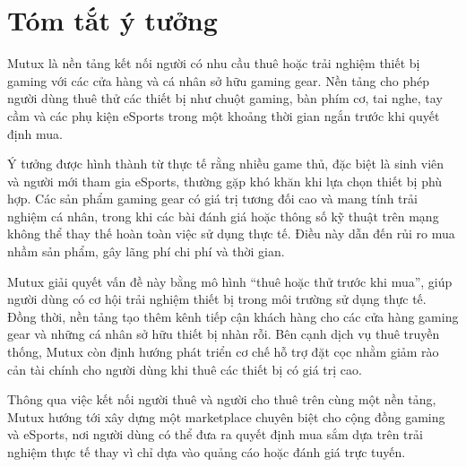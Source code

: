 \section{Tóm tắt ý tưởng}

Mutux là nền tảng kết nối người có nhu cầu thuê hoặc trải nghiệm thiết bị gaming với các cửa hàng và cá nhân sở hữu gaming gear. Nền tảng cho phép người dùng thuê thử các thiết bị như chuột gaming, bàn phím cơ, tai nghe, tay cầm và các phụ kiện eSports trong một khoảng thời gian ngắn trước khi quyết định mua.

Ý tưởng được hình thành từ thực tế rằng nhiều game thủ, đặc biệt là sinh viên và người mới tham gia eSports, thường gặp khó khăn khi lựa chọn thiết bị phù hợp. Các sản phẩm gaming gear có giá trị tương đối cao và mang tính trải nghiệm cá nhân, trong khi các bài đánh giá hoặc thông số kỹ thuật trên mạng không thể thay thế hoàn toàn việc sử dụng thực tế. Điều này dẫn đến rủi ro mua nhầm sản phẩm, gây lãng phí chi phí và thời gian.

Mutux giải quyết vấn đề này bằng mô hình “thuê hoặc thử trước khi mua”, giúp người dùng có cơ hội trải nghiệm thiết bị trong môi trường sử dụng thực tế. Đồng thời, nền tảng tạo thêm kênh tiếp cận khách hàng cho các cửa hàng gaming gear và những cá nhân sở hữu thiết bị nhàn rỗi. Bên cạnh dịch vụ thuê truyền thống, Mutux còn định hướng phát triển cơ chế hỗ trợ đặt cọc nhằm giảm rào cản tài chính cho người dùng khi thuê các thiết bị có giá trị cao.

Thông qua việc kết nối người thuê và người cho thuê trên cùng một nền tảng, Mutux hướng tới xây dựng một marketplace chuyên biệt cho cộng đồng gaming và eSports, nơi người dùng có thể đưa ra quyết định mua sắm dựa trên trải nghiệm thực tế thay vì chỉ dựa vào quảng cáo hoặc đánh giá trực tuyến.
